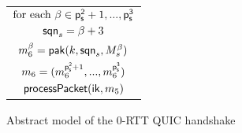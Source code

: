 \begin{figure*}[!htp]
\begin{center}
\begin{enumerate}
{\begin{minipage}[t]{0.38\textwidth}
\begin{tabular}{c}
    $\text{for each } \beta \in {\ensuremath{\mathsf{p_s^{2}}}+1,...,\ensuremath{\mathsf{p_s^{3}}}}$ \\
    $\mathsf{sqn}_s = \beta + 3$ \\
    $m_{6}^{\beta} = \mathsf{pak}(k, \mathsf{sqn}_s, M_s^{\beta})$ \\
    $m_{6} = (m_{6}^{\mathsf{p_s^{2}}+1},...,m_{6}^{\mathsf{p_s^{3}}})$ \\
    $\mathsf{processPacket}(\mathsf{ik}, m_{5})$ \\
   \end{tabular}
  \end{minipage}%
 }
\end{enumerate}
 \caption{Abstract model of the 0-RTT QUIC handshake}\label{fig:quic_abst_0rtt}
 \end{center}
\end{figure*}